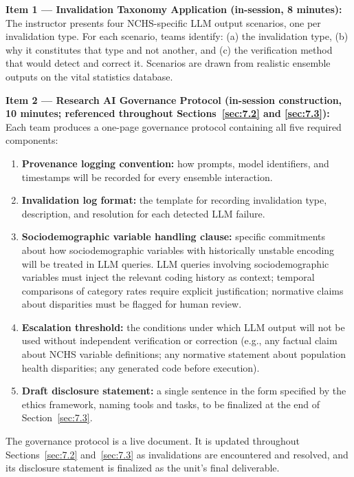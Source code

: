 \textbf{Item 1 --- Invalidation Taxonomy Application (in-session,
8 minutes):}
The instructor presents four NCHS-specific LLM output scenarios,
one per invalidation type. For each scenario, teams identify:
(a) the invalidation type, (b) why it constitutes that type and
not another, and (c) the verification method that would detect
and correct it. Scenarios are drawn from realistic ensemble
outputs on the vital statistics database.

\textbf{Item 2 --- Research AI Governance Protocol
(in-session construction, 10 minutes; referenced throughout
Sections~\ref{sec:7.2} and \ref{sec:7.3}):}
Each team produces a one-page governance protocol containing
all five required components:
\begin{enumerate}
    \item \textbf{Provenance logging convention:} how prompts,
    model identifiers, and timestamps will be recorded for every
    ensemble interaction.

    \item \textbf{Invalidation log format:} the template for
    recording invalidation type, description, and resolution for
    each detected LLM failure.

    \item \textbf{Sociodemographic variable handling clause:}
    specific commitments about how sociodemographic variables
    with historically unstable encoding will be treated in
    LLM queries. 
    LLM queries involving sociodemographic variables must inject the
    relevant coding history as context; temporal comparisons
    of category rates require explicit justification;
    normative claims about disparities must be flagged
    for human review. 

    \item \textbf{Escalation threshold:} the conditions under
    which LLM output will not be used without independent
    verification or correction (e.g., any factual claim about
    NCHS variable definitions; any normative statement about
    population health disparities; any generated code before
    execution).

    \item \textbf{Draft disclosure statement:} a single sentence
    in the form specified by the ethics framework, naming tools
    and tasks, to be finalized at the end of Section~\ref{sec:7.3}.
\end{enumerate}

The governance protocol is a live document. It is updated
throughout Sections~\ref{sec:7.2} and~\ref{sec:7.3} as
invalidations are encountered and resolved, and its disclosure
statement is finalized as the unit's final deliverable.

